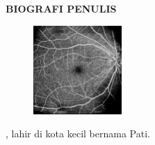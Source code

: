 \begin{center}
  \Large
  \textbf{BIOGRAFI PENULIS}
\end{center}


\vspace{2ex}

\begin{figure}
  \centering
  \vspace{-3ex}
  \includegraphics[width=0.3\textwidth]{gambar/exampleimage.png}
  \vspace{-4ex}
\end{figure}

\name{}, lahir di kota kecil bernama Pati.